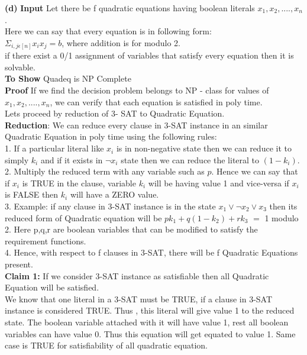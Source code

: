 \documentclass[11pt]{article}
\renewcommand\part[1]{\vspace{.10in}\textbf{(#1)}}
\begin{document}
\part{d}
{\bf Input} Let there be f quadratic equations having boolean literals $x_1,x_2,....,x_n$.
\\ Here we can say that every equation is in following form:
\\ $\Sigma_{i,j \epsilon [n]} x_{i}x_{j} = b$, where addition is for modulo 2.
\\ if there exist a 0/1 assignment of variables that satisfy every equation then it is solvable.
\\ {\bf To Show} Quadeq is NP Complete
\\ {\bf Proof} If we find the decision problem belongs to NP - class for values of $x_1,x_2,....,x_n$, we can verify that each equation is satisfied in poly time.
\\ Lets proceed by reduction of 3- SAT to Quadratic Equation.
\\ {\bf Reduction}: We can reduce every clause in 3-SAT instance in an similar Quadratic Equation in poly time using the following rules:
\\ 1. If a particular literal like $x_i$ is in non-negative state then we can reduce it to simply $k_i$ and if it exists in $\neg x_i$ state then we can reduce the literal to $(1-k_i)$.
\\ 2. Multiply the reduced term with any variable such as $p$. Hence we can say that if $x_i$ is TRUE in the clause, variable $k_i$ will be having value 1 and vice-versa if $x_i$ is FALSE then $k_i$ will have a ZERO value.
\\ 3. Example: if any clause in 3-SAT instance is in the state $x_1 \lor \neg x_2 \lor x_3$ then its reduced form of Quadratic equation will be $p k_1 + q (1 - k_2) + r k_3$ $=$ 1 modulo 2. Here p,q,r are boolean variables that can be modified to satisfy the requirement functions.
\\ 4. Hence, with respect to f clauses in 3-SAT, there will be f Quadratic Equations present.
\\ {\bf Claim 1:} If we consider 3-SAT instance as satisfiable then all Quadratic Equation will be satisfied.
\\ We know that one literal in a 3-SAT must be TRUE, if a clause in 3-SAT instance is considered TRUE.  Thus , this literal will give value 1 to the reduced state. The boolean variable attached with it will have value 1, rest all boolean variables can have value 0. Thus this equation will get equated to value 1. Same case is TRUE for satisfiability of all quadratic equation.
\end{document}
